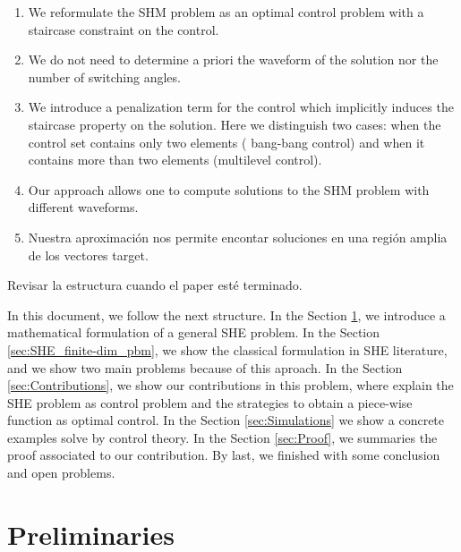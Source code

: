 \documentclass[twocolumn]{autart}    %
\begin{document}
\begin{enumerate}
    \item[1.] We reformulate the SHM problem as an optimal control problem with a staircase constraint on the control.
	\item[2.] We do not need to determine a priori the waveform of the solution nor the number of switching angles.  
    \item[3.] We introduce a penalization term for the control which implicitly induces the staircase property on the solution. Here we distinguish two cases: when the control set contains only two elements ( bang-bang control) and when it contains more than two elements (multilevel control).
    \item[4.] Our approach allows one to compute solutions to the SHM problem with different waveforms.
    \JOStart
    \item[5 ] Nuestra aproximación nos permite encontar soluciones en una región amplia de los vectores target.
\end{enumerate}

{\color{red} Revisar la estructura cuando el paper est\'e terminado.

In this document, we follow the next structure. In the Section \ref{sec:math_formulation}, we introduce a mathematical formulation of a general SHE problem. 
%
In the Section \ref{sec:SHE_finite-dim_pbm}, we show the classical formulation in SHE literature, and we show two main problems because of this aproach. 
%
In the Section \ref{sec:Contributions}, we show our contributions in this problem, where explain the SHE problem as control problem and the strategies to obtain a piece-wise function as optimal control. 
%
In the Section \ref{sec:Simulations} we show a concrete examples solve by control theory. 
%
In the Section \ref{sec:Proof}, we summaries the proof associated to our contribution. 
%
By last, we finished with some conclusion and open problems. 
}

\section{Preliminaries}\label{sec:math_formulation}
\end{document}
